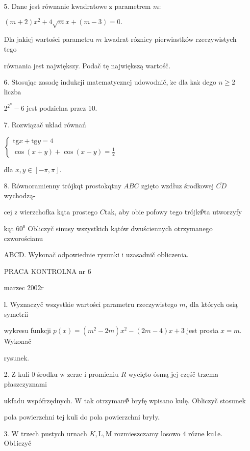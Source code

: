 \documentclass[a4paper,12pt]{article}
\begin{document}
5. Dane jest równanie kwadratowe $\mathrm{z}$ parametrem $m$:

$(m+2)x^{2}+4\sqrt{m}x+(m-3)=0.$

Dla jakiej wartości parametru $m$ kwadrat róznicy pierwiastków rzeczywistych tego

równania jest największy. Podač tę największą wartośč.

6. Stosując zasadę indukcji matematycznej udowodnič, $\dot{\mathrm{z}}\mathrm{e}$ dla $\mathrm{k}\mathrm{a}\dot{\mathrm{z}}$ dego $n \geq 2$ liczba

$2^{2^{n}}-6$ jest podzielna przez 10.

7. Rozwiązač uklad równań

$\left\{\begin{array}{l}
\mathrm{t}\mathrm{g}x+\mathrm{t}\mathrm{g}y=4\\
\cos(x+y)+\cos(x-y)=\frac{1}{2}
\end{array}\right.$

dla $x, y\in[-\pi,\pi].$

8. Równoramienny trójkqt prostokqtny $ABC$ zgięto wzdłuz środkowej $\overline{CD}$ wychodzą-

cej $\mathrm{z}$ wierzchofka kąta prostego $C\mathrm{t}\mathrm{a}\mathrm{k}$, aby obie pofowy tego trójk$\Phi$ta utworzyfy

kąt $60^{0}$ Obliczyč sinusy wszystkich kątów dwuściennych otrzymanego czworościanu

ABCD. Wykonač odpowiednie rysunki $\mathrm{i}$ uzasadnič obliczenia.





PRACA KONTROLNA nr 6

marzec 2002r

l. Wyznaczyč wszystkie wartości parametru rzeczywistego $m$, dla których osią symetrii

wykresu funkcji $p(x)=(m^{2}-2m)x^{2}-(2m-4)x+3$ jest prosta $x=m$. Wykonač

rysunek.

2. $\mathrm{Z}$ kuli $0$ środku $\mathrm{w}$ zerze $\mathrm{i}$ promieniu $R$ wycięto ósmą jej częśč trzema płaszczyznami

ukfadu wspófrzędnych. $\mathrm{W}$ tak $\mathrm{o}\mathrm{t}\mathrm{r}\mathrm{z}\mathrm{y}\mathrm{m}\mathrm{a}\mathrm{n}\Phi$ bryfę wpisano kulę. Obliczyč stosunek

pola powierzchni tej kuli do pola powierzchni bryły.

3. $\mathrm{W}$ trzech pustych urnach $K, \mathrm{L}, \mathrm{M}$ rozmieszczamy losowo 4 rózne ku1e. Ob1iczyč
\end{document}
